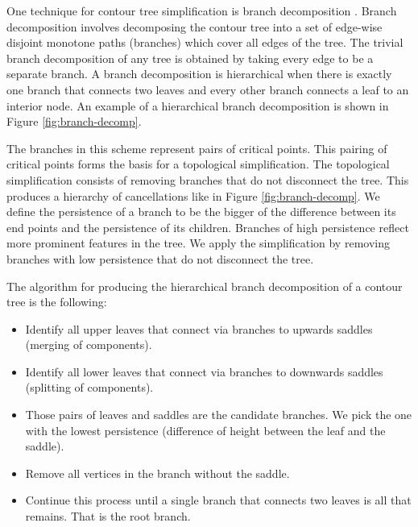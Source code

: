 

One technique for contour tree simplification is branch decomposition \cite{ct-branch-decomp}. Branch decomposition involves decomposing the contour tree into a set of edge-wise disjoint monotone paths (branches) which cover all edges of the tree. The trivial branch decomposition of any tree is obtained by taking every edge to be a separate branch. A branch decomposition is hierarchical when there is exactly one branch that connects two leaves and every other branch connects a leaf to an interior node. An example of a hierarchical branch decomposition is shown in Figure \ref{fig:branch-decomp}.

The branches in this scheme represent pairs of critical points. This pairing of critical points forms the basis for a topological simplification. The topological simplification consists of removing branches that do not disconnect the tree. This produces a hierarchy of cancellations like in Figure \ref{fig:branch-decomp}. We define the persistence of a branch to be the bigger of the difference between its end points and the persistence of its children. Branches of high persistence reflect more prominent features in the tree. We apply the simplification by removing branches with low persistence that do not disconnect the tree.

The algorithm for producing the hierarchical branch decomposition of a contour tree is the following:

\begin{itemize}
    \item Identify all upper leaves that connect via branches to upwards saddles (merging of components).
    \item Identify all lower leaves that connect via branches to downwards saddles (splitting of components).
    \item Those pairs of leaves and saddles are the candidate branches. We pick the one with the lowest persistence (difference of height between the leaf and the saddle).
    \item Remove all vertices in the branch without the saddle.
    \item Continue this process until a single branch that connects two leaves is all that remains. That is the root branch.
\end{itemize}

